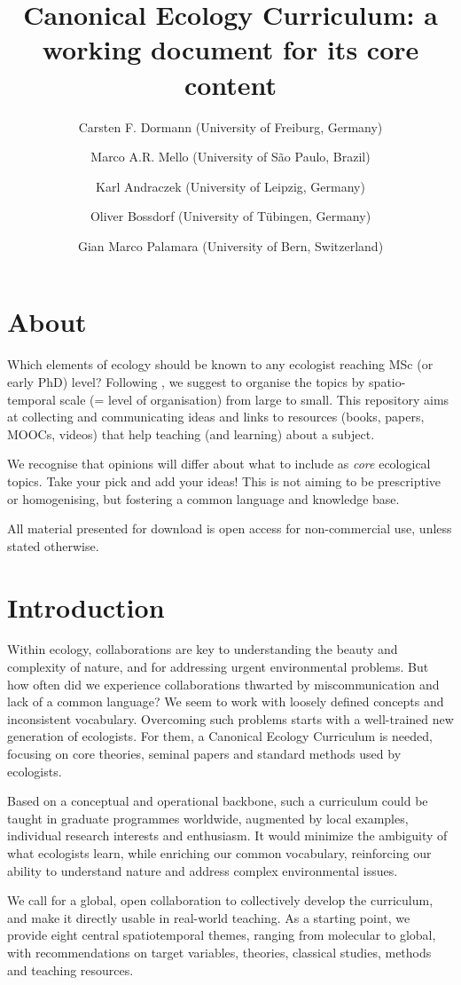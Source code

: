 \documentclass[english,11pt,a4paper, landscape]{article}
\title{Canonical Ecology Curriculum: a working document for its core content}
\author{Carsten F. Dormann (University of Freiburg, Germany)\and Marco A.R. Mello (University of São Paulo, Brazil) \and Karl Andraczek (University of Leipzig, Germany) \and Oliver Bossdorf (University of Tübingen, Germany) \and Gian Marco Palamara (University of Bern, Switzerland)}
\begin{document}
\maketitle

\section{About}
Which elements of ecology should be known to any ecologist reaching MSc (or early PhD) level? Following \citet{Dormann2023}, we suggest to organise the topics by spatio-temporal scale (= level of organisation) from large to small. This repository aims at collecting and communicating ideas and links to resources (books, papers, MOOCs, videos) that help teaching (and learning) about a subject.

We recognise that opinions will differ about what to include as \emph{core} ecological topics. Take your pick and add your ideas! This is not aiming to be prescriptive or homogenising, but fostering a common language and knowledge base.

All material presented for download is open access for non-commercial use, unless stated otherwise.


\section{Introduction}
Within ecology, collaborations are key to understanding the beauty and complexity of nature, and for addressing urgent environmental problems. But how often did we experience collaborations thwarted by miscommunication and lack of a common language? We seem to work with loosely defined concepts and inconsistent vocabulary. Overcoming such problems starts with a well-trained new generation of ecologists. For them, a Canonical Ecology Curriculum is needed, focusing on core theories, seminal papers and standard methods used by ecologists.

Based on a conceptual and operational backbone, such a curriculum could be taught in graduate programmes worldwide, augmented by local examples, individual research interests and enthusiasm. It would minimize the ambiguity of what ecologists learn, while enriching our common vocabulary, reinforcing our ability to understand nature and address complex environmental issues. 

We call for a global, open collaboration to collectively develop the curriculum, and make it directly usable in real-world teaching. As a starting point, we provide eight central spatiotemporal themes, ranging from molecular to global, with recommendations on target variables, theories, classical studies, methods and teaching resources. 
\end{document}
